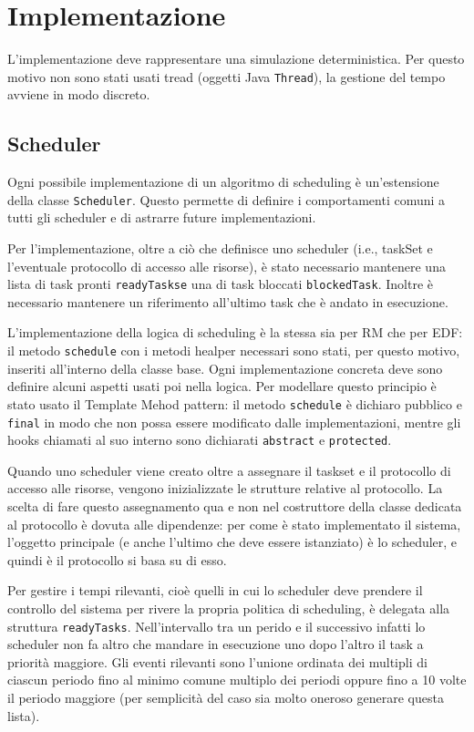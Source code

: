 \chapter{Implementazione}

L'implementazione deve rappresentare una simulazione deterministica. Per questo motivo non sono stati usati tread (oggetti Java \texttt{Thread}), la gestione del tempo avviene in modo discreto.

\section{Scheduler}
Ogni possibile implementazione di un algoritmo di scheduling è un'estensione della classe \texttt{Scheduler}. Questo permette di definire i comportamenti comuni a tutti gli scheduler e di astrarre future implementazioni.

Per l'implementazione, oltre a ciò che definisce uno scheduler (i.e., taskSet e l'eventuale protocollo di accesso alle risorse), è stato necessario mantenere una lista di task pronti \texttt{readyTaskse} una di task bloccati \texttt{blockedTask}. Inoltre è necessario mantenere un riferimento all'ultimo task che è andato in esecuzione.

\myskip

L'implementazione della logica di scheduling è la stessa sia per RM che per EDF: il metodo \texttt{schedule} con i metodi healper necessari sono stati, per questo motivo, inseriti all'interno della classe base. Ogni implementazione concreta deve sono definire alcuni aspetti usati poi nella logica. Per modellare questo principio è stato usato il Template Mehod pattern: il metodo \texttt{schedule} è dichiaro pubblico e \texttt{final} in modo che non possa essere modificato dalle implementazioni, mentre gli hooks chiamati al suo interno sono dichiarati \texttt{abstract} e \texttt{protected}.

\myskip

Quando uno scheduler viene creato oltre a assegnare il taskset e il protocollo di accesso alle risorse, vengono inizializzate le strutture relative al protocollo. La scelta di fare questo assegnamento qua e non nel costruttore della classe dedicata al protocollo è dovuta alle dipendenze: per come è stato implementato il sistema, l'oggetto principale (e anche l'ultimo che deve essere istanziato) è lo scheduler, e quindi è il protocollo si basa su di esso.

Per gestire i tempi rilevanti, cioè quelli in cui lo scheduler deve prendere il controllo del sistema per rivere la propria politica di scheduling, è delegata alla struttura \texttt{readyTasks}. Nell'intervallo tra un perido e il successivo infatti lo scheduler non fa altro che mandare in esecuzione uno dopo l'altro il task a priorità maggiore. Gli eventi rilevanti sono l’unione ordinata dei multipli di ciascun periodo fino al minimo comune multiplo dei periodi oppure fino a 10 volte il periodo maggiore (per semplicità del caso sia molto oneroso generare questa lista).

